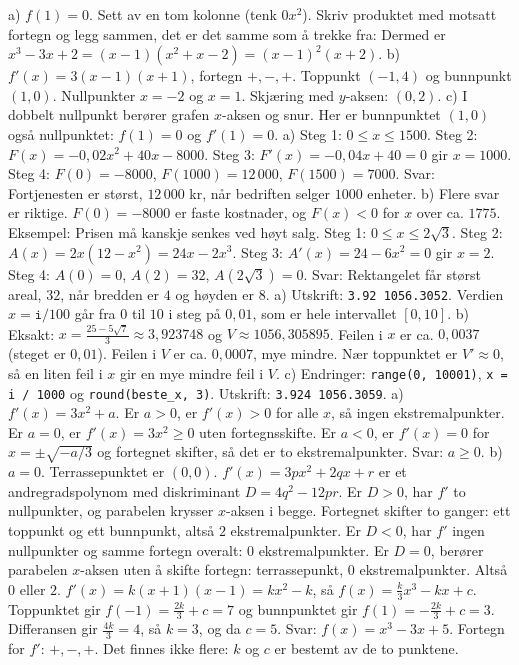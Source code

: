  a) $f(1) = 0$. Sett av en tom kolonne (tenk $0x^2$). Skriv produktet med motsatt fortegn og legg sammen, det er det samme som å trekke fra:
{\small{}}
Dermed er $x^3 - 3x + 2 = (x - 1)(x^2 + x - 2) = (x - 1)^2(x + 2)$.
b) $f'(x) = 3(x - 1)(x + 1)$, fortegn $+, -, +$. Toppunkt $(-1, 4)$ og bunnpunkt $(1, 0)$. Nullpunkter $x = -2$ og $x = 1$. Skjæring med $y$-aksen: $(0, 2)$.
c) I dobbelt nullpunkt berører grafen $x$-aksen og snur. Her er bunnpunktet $(1, 0)$ også nullpunktet: $f(1) = 0$ og $f'(1) = 0$.
 a) Steg 1: $0 \le x \le 1500$. Steg 2: $F(x) = -0,02x^2 + 40x - 8000$. Steg 3: $F'(x) = -0,04x + 40 = 0$ gir $x = 1000$. Steg 4: $F(0) = -8000$, $F(1000) = 12\,000$, $F(1500) = 7000$.
Svar: Fortjenesten er størst, $12\,000$ kr, når bedriften selger $1000$ enheter.
b) Flere svar er riktige. $F(0) = -8000$ er faste kostnader, og $F(x) < 0$ for $x$ over ca. $1775$. Eksempel: Prisen må kanskje senkes ved høyt salg.
 Steg 1: $0 \le x \le 2\sqrt{3}$. Steg 2: $A(x) = 2x(12 - x^2) = 24x - 2x^3$. Steg 3: $A'(x) = 24 - 6x^2 = 0$ gir $x = 2$. Steg 4: $A(0) = 0$, $A(2) = 32$, $A(2\sqrt{3}) = 0$.
Svar: Rektangelet får størst areal, $32$, når bredden er $4$ og høyden er $8$.
 a) Utskrift: \texttt{3.92 1056.3052}. Verdien $x = \texttt{i}/100$ går fra $0$ til $10$ i steg på $0,01$, som er hele intervallet $[0, 10]$.
b) Eksakt: $x = \frac{25 - 5\sqrt{7}}{3} \approx 3,923748$ og $V \approx 1056,305895$. Feilen i $x$ er ca. $0,0037$ (steget er $0,01$). Feilen i $V$ er ca. $0,0007$, mye mindre. Nær toppunktet er $V' \approx 0$, så en liten feil i $x$ gir en mye mindre feil i $V$.
c) Endringer: \texttt{range(0, 10001)}, \texttt{x = i / 1000} og \texttt{round(beste\_x, 3)}. Utskrift: \texttt{3.924 1056.3059}.
 a) $f'(x) = 3x^2 + a$. Er $a > 0$, er $f'(x) > 0$ for alle $x$, så ingen ekstremalpunkter. Er $a = 0$, er $f'(x) = 3x^2 \ge 0$ uten fortegnsskifte. Er $a < 0$, er $f'(x) = 0$ for $x = \pm\sqrt{-a/3}$ og fortegnet skifter, så det er to ekstremalpunkter. Svar: $a \ge 0$.
b) $a = 0$. Terrassepunktet er $(0, 0)$.
 $f'(x) = 3px^2 + 2qx + r$ er et andregradspolynom med diskriminant $D = 4q^2 - 12pr$. Er $D > 0$, har $f'$ to nullpunkter, og parabelen krysser $x$-aksen i begge. Fortegnet skifter to ganger: ett toppunkt og ett bunnpunkt, altså $2$ ekstremalpunkter.
Er $D < 0$, har $f'$ ingen nullpunkter og samme fortegn overalt: $0$ ekstremalpunkter. Er $D = 0$, berører parabelen $x$-aksen uten å skifte fortegn: terrassepunkt, $0$ ekstremalpunkter. Altså $0$ eller $2$.
 $f'(x) = k(x + 1)(x - 1) = kx^2 - k$, så $f(x) = \frac{k}{3}x^3 - kx + c$. Toppunktet gir $f(-1) = \frac{2k}{3} + c = 7$ og bunnpunktet gir $f(1) = -\frac{2k}{3} + c = 3$. Differansen gir $\frac{4k}{3} = 4$, så $k = 3$, og da $c = 5$. Svar: $f(x) = x^3 - 3x + 5$. Fortegn for $f'$: $+, -, +$. Det finnes ikke flere: $k$ og $c$ er bestemt av de to punktene.
